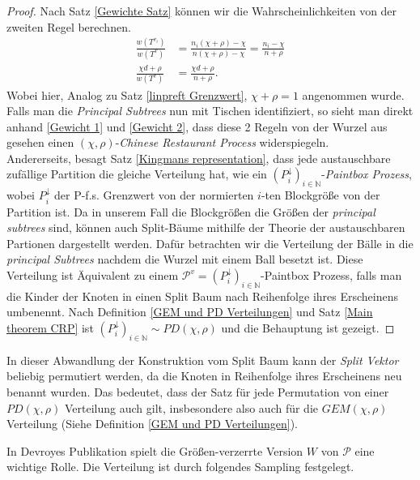 \begin{proof}
    Nach Satz \ref{Gewichte Satz} können wir die Wahrscheinlichkeiten von der zweiten Regel berechnen.
    \begin{align}
         \frac{w(T^{v_i})}{w(T^{v})} &= \frac{n_i(\chi + \rho) - \chi}{n(\chi+ \rho) - \chi} = \frac{n_i - \chi}{ n + \rho} \label{Gewicht 1}\\  
         \frac{\chi d + \rho}{w(T^{v})} &= \frac{\chi d + \rho}{ n + \rho} \label{Gewicht 2}.
    \end{align}
    Wobei hier, Analog zu Satz \ref{linpreft Grenzwert}, $\chi + \rho = 1$ angenommen wurde.  Falls man die \textit{Principal Subtrees} nun mit Tischen identifiziert, so sieht man direkt anhand \ref{Gewicht 1} und \ref{Gewicht 2}, dass diese 2 Regeln von der Wurzel aus gesehen einen $(\chi,\rho)$-\textit{Chinese Restaurant Process} widerspiegeln.\\
    Andererseits, besagt Satz \ref{Kingmans representation}, dass jede austauschbare zufällige Partition die gleiche Verteilung hat, wie ein $(P^{\downarrow}_i)_{i \in \mathbb{N}}$-\textit{Paintbox Prozess}, wobei $P^{\downarrow}_i$ der P-f.s. Grenzwert von der normierten $i$-ten Blockgröße von der Partition ist. Da in unserem Fall die Blockgrößen die Größen der \textit{principal subtrees} sind, können auch Split-Bäume mithilfe der Theorie der austauschbaren Partionen dargestellt werden. Dafür betrachten wir die Verteilung der Bälle in die \textit{principal Subtrees} nachdem die Wurzel mit einem Ball besetzt ist. Diese Verteilung ist Äquivalent zu einem $\mathcal{P}^{v} = (P_i^{\downarrow})_{i \in \mathbb{N}}$-Paintbox Prozess, falls man die Kinder der Knoten in einen Split Baum nach Reihenfolge ihres Erscheinens umbenennt. Nach Definition \ref{GEM und PD Verteilungen} und Satz \ref{Main theorem CRP} ist $(P^{\downarrow}_i)_{i \in \mathbb{N}} \sim PD(\chi,\rho)$ und die Behauptung ist gezeigt. 

\end{proof}
\begin{Bemerkung}
    \label{Bemerkung PD Verteilungen}
    In dieser Abwandlung der Konstruktion vom Split Baum kann der \textit{Split Vektor} beliebig permutiert werden, da die Knoten in Reihenfolge ihres Erscheinens neu benannt wurden. Das bedeutet, dass der Satz für jede Permutation von einer $PD(\chi,\rho)$ Verteilung auch gilt, insbesondere also auch für die $GEM(\chi,\rho)$ Verteilung (Siehe Definition \ref{GEM und PD Verteilungen}).
\end{Bemerkung}
In Devroyes Publikation \cite{devroye1998universal} spielt die Größen-verzerrte Version $W$ von $\mathcal{P}$ eine wichtige Rolle. Die Verteilung ist durch folgendes Sampling festgelegt.
